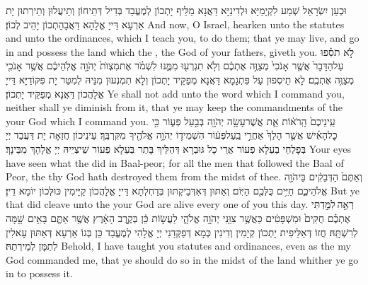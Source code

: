 {וּכְעַן יִשְׂרָאֵל שְׁמַע לִקְיָמַיָּא וּלְדִינַיָּא דַּאֲנָא מַלֵּיף יָתְכוֹן לְמֶעֱבַד בְּדִיל דְּתֵיחוֹן וְתֵיעֲלוּן וְתֵירְתוּן יָת אַרְעָא דַּייָ אֱלָהָא דַּאֲבָהָתְכוֹן יָהֵיב לְכוֹן׃}
{And now, O Israel, hearken unto the statutes and unto the ordinances, which I teach you, to do them; that ye may live, and go in and possess the land which the \lord, the God of your fathers, giveth you.}{}
{לֹ֣א תֹסִ֗פוּ עַל\maqqaf הַדָּבָר֙ אֲשֶׁ֤ר אָנֹכִי֙ מְצַוֶּ֣ה אֶתְכֶ֔ם וְלֹ֥א תִגְרְע֖וּ מִמֶּ֑נּוּ לִשְׁמֹ֗ר אֶת\maqqaf מִצְוֺת֙ יְהֹוָ֣ה אֱלֹֽהֵיכֶ֔ם אֲשֶׁ֥ר אָנֹכִ֖י מְצַוֶּ֥ה אֶתְכֶֽם׃}
{לָא תֵיסְפוּן עַל פִּתְגָמָא דַּאֲנָא מְפַקֵּיד יָתְכוֹן וְלָא תִמְנְעוּן מִנֵּיהּ לְמִטַּר יָת פִּקּוֹדַיָּא דַּייָ אֱלָהֲכוֹן דַּאֲנָא מְפַקֵּיד יָתְכוֹן׃}
{Ye shall not add unto the word which I command you, neither shall ye diminish from it, that ye may keep the commandments of the \lord\space your God which I command you.}{}
{עֵֽינֵיכֶם֙ הָֽרֹא֔וֹת אֵ֛ת אֲשֶׁר\maqqaf עָשָׂ֥ה יְהֹוָ֖ה בְּבַ֣עַל פְּע֑וֹר כִּ֣י כׇל\maqqaf הָאִ֗ישׁ אֲשֶׁ֤ר הָלַךְ֙ אַחֲרֵ֣י בַֽעַל\maqqaf פְּע֔וֹר הִשְׁמִיד֛וֹ יְהֹוָ֥ה אֱלֹהֶ֖יךָ מִקִּרְבֶּֽךָ׃}
{עֵינֵיכוֹן חֲזַאָה יָת דַּעֲבַד יְיָ בְּפָלְחֵי בַעְלָא פְעוֹר אֲרֵי כָל גּוּבְרָא דְּהַלֵּיךְ בָּתַר בַּעְלָא פְעוֹר שֵׁיצְיֵיהּ יְיָ אֱלָהָךְ מִבֵּינָךְ׃}
{Your eyes have seen what the \lord\space did in Baal-peor; for all the men that followed the Baal of Peor, the \lord\space thy God hath destroyed them from the midst of thee.}{}
{וְאַתֶּם֙ הַדְּבֵקִ֔ים בַּיהֹוָ֖ה אֱלֹהֵיכֶ֑ם חַיִּ֥ים כֻּלְּכֶ֖ם הַיּֽוֹם׃}
{וְאַתּוּן דְּאִדְּבֵיקְתּוּן בְּדַחְלְתָא דַּייָ אֱלָהֲכוֹן קַיָּימִין כּוּלְּכוֹן יוֹמָא דֵין׃}
{But ye that did cleave unto the \lord\space your God are alive every one of you this day.}{}
{רְאֵ֣ה \legarmeh  לִמַּ֣דְתִּי אֶתְכֶ֗ם חֻקִּים֙ וּמִשְׁפָּטִ֔ים כַּאֲשֶׁ֥ר צִוַּ֖נִי יְהֹוָ֣ה אֱלֹהָ֑י לַעֲשׂ֣וֹת כֵּ֔ן בְּקֶ֣רֶב הָאָ֔רֶץ אֲשֶׁ֥ר אַתֶּ֛ם בָּאִ֥ים שָׁ֖מָּה לְרִשְׁתָּֽהּ׃}
{חֲזוֹ דְּאַלֵּיפִית יָתְכוֹן קְיָמִין וְדִינִין כְּמָא דְּפַקְּדַנִי יְיָ אֱלָהִי לְמֶעֱבַד כֵּן בְּגוֹ אַרְעָא דְּאַתּוּן עָאלִין לְתַמָּן לְמֵירְתַהּ׃}
{Behold, I have taught you statutes and ordinances, even as the \lord\space my God commanded me, that ye should do so in the midst of the land whither ye go in to possess it.}{}
